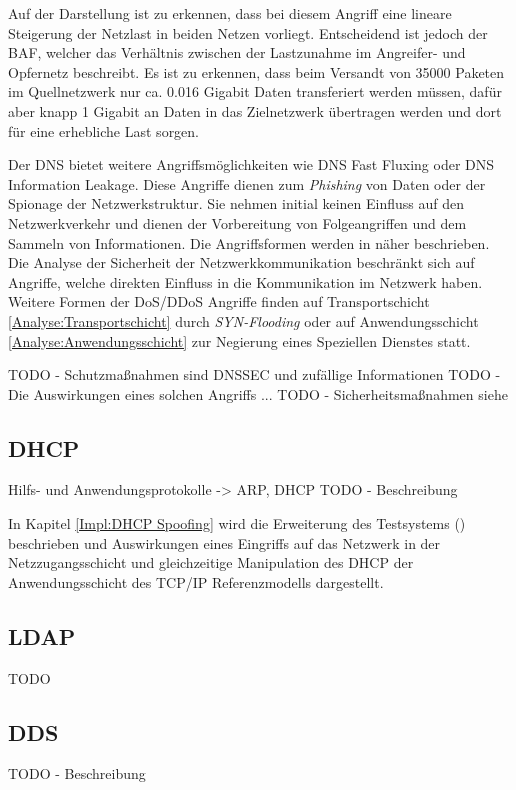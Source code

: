 Auf der Darstellung ist zu erkennen, dass bei diesem Angriff eine lineare Steigerung der Netzlast in beiden Netzen vorliegt. Entscheidend ist jedoch der \ac{BAF}, welcher das Verhältnis zwischen der Lastzunahme im Angreifer- und Opfernetz beschreibt. Es ist zu erkennen, dass beim Versandt von 35000 Paketen im Quellnetzwerk nur ca. 0.016 Gigabit Daten transferiert werden müssen, dafür aber knapp 1 Gigabit an Daten in das Zielnetzwerk übertragen werden und dort für eine erhebliche Last sorgen.

Der \ac{DNS} bietet weitere Angriffsmöglichkeiten wie \ac{DNS} Fast Fluxing oder \ac{DNS} Information Leakage. Diese Angriffe dienen zum \textit{Phishing} von Daten oder der Spionage der Netzwerkstruktur. Sie nehmen initial keinen Einfluss auf den Netzwerkverkehr und dienen der Vorbereitung von Folgeangriffen und dem Sammeln von Informationen. Die Angriffsformen werden in \cite{Ledermueller2009} näher beschrieben. Die Analyse der Sicherheit der Netzwerkkommunikation beschränkt sich auf Angriffe, welche direkten Einfluss in die Kommunikation im Netzwerk haben. Weitere Formen der \ac{DoS}/\ac{DDoS} Angriffe finden auf Transportschicht \autoref{Analyse:Transportschicht} durch \textit{SYN-Flooding} oder auf Anwendungsschicht \autoref{Analyse:Anwendungsschicht} zur Negierung eines Speziellen Dienstes statt.

TODO - Schutzmaßnahmen sind DNSSEC und zufällige Informationen \label{Analyse:DNSSEC}
TODO - Die Auswirkungen eines solchen Angriffs ...
TODO - Sicherheitsmaßnahmen siehe \cite{Ledermueller2009}

\subsection{DHCP}
Hilfs- und Anwendungsprotokolle -> ARP, DHCP
TODO - Beschreibung

In Kapitel \autoref{Impl:DHCP Spoofing} wird die Erweiterung des Testsystems (\cite{Weber2018}) beschrieben und Auswirkungen eines Eingriffs auf das Netzwerk in der Netzzugangsschicht und gleichzeitige Manipulation des \ac{DHCP} der Anwendungsschicht des \ac{TCP}/\ac{IP} Referenzmodells dargestellt.

\subsection{LDAP}
TODO 

\subsection{\ac{DDS}}
TODO - Beschreibung

